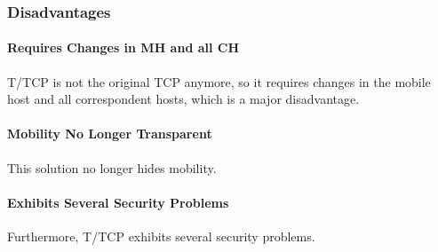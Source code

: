 \subsubsection{Disadvantages}
\paragraph*{Requires Changes in MH and all CH}
T/TCP is not the original TCP anymore, so it requires changes in the mobile host and all correspondent hosts, which is a major disadvantage. 

\paragraph*{Mobility No Longer Transparent}
This solution no longer hides mobility. 

\paragraph*{Exhibits Several Security Problems}
Furthermore, T/TCP exhibits several security problems.


